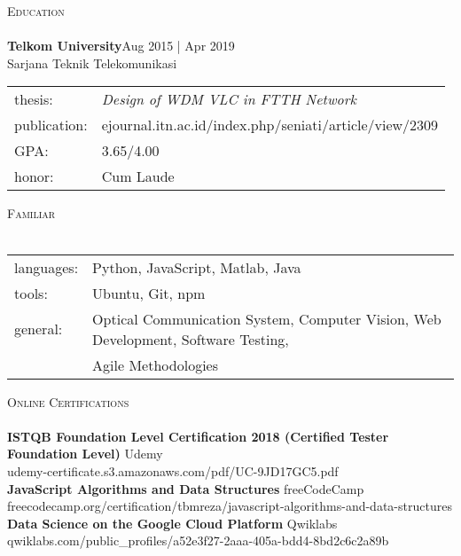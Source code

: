 \documentclass[a4paper]{article}
\newcommand{\lineunder} {
    \vspace*{-8pt} \\
    \hspace*{-18pt} \hrulefill \\
}
\newcommand{\header} [1] {
    {\hspace*{-18pt}\vspace*{6pt} \textsc{#1}}
    \vspace*{-6pt} \lineunder
}
\begin{document}
\vspace*{2mm}

\header{Education}
\textbf{Telkom University}\hfill Aug 2015 | Apr 2019\\
Sarjana Teknik Telekomunikasi\\


\begin{tabular}{ l l }
	thesis:       & \textit{Design of WDM VLC in FTTH Network}\\
	publication:  & ejournal.itn.ac.id/index.php/seniati/article/view/2309\\
  GPA:          & 3.65/4.00\\ 
  honor:        & Cum Laude\\
\end{tabular}
\vspace{2mm}

\header{Familiar}
\begin{tabular}{ l l }
	languages: & Python, JavaScript, Matlab, Java\\
  tools: & Ubuntu, Git, npm\\        
  general: & Optical Communication System, Computer Vision, Web Development, Software Testing, \\
  & Agile Methodologies\\                   
\end{tabular}
\vspace{2mm}

\header{Online Certifications}
\textbf{ISTQB Foundation Level Certification 2018 (Certified Tester Foundation Level)} \hfill Udemy\\
udemy-certificate.s3.amazonaws.com/pdf/UC-9JD17GC5.pdf\\
\vspace*{2mm}
\textbf{JavaScript Algorithms and Data Structures} \hfill freeCodeCamp\\
freecodecamp.org/certification/tbmreza/javascript-algorithms-and-data-structures\\
\vspace*{2mm}
\textbf{Data Science on the Google Cloud
Platform} \hfill Qwiklabs\\
qwiklabs.com/public\_profiles/a52e3f27-2aaa-405a-bdd4-8bd2c6c2a89b\\


\ 
\end{document}
